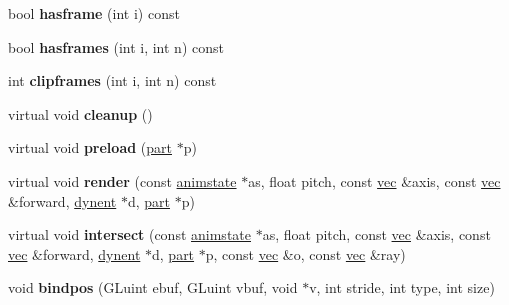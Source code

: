 \begin{DoxyCompactItemize}
\item 
\mbox{\label{structanimmodel_1_1meshgroup_a15dbdfc1083a258110a8d656152b5e35}} 
bool {\bfseries hasframe} (int i) const
\item 
\mbox{\label{structanimmodel_1_1meshgroup_ad8e26304cb9c795c7c1d62858d99ac69}} 
bool {\bfseries hasframes} (int i, int n) const
\item 
\mbox{\label{structanimmodel_1_1meshgroup_a045d04608f8a49435b9ba54459d32fde}} 
int {\bfseries clipframes} (int i, int n) const
\item 
\mbox{\label{structanimmodel_1_1meshgroup_a2a46d8085d77c9ea70110461ca65cec6}} 
virtual void {\bfseries cleanup} ()
\item 
\mbox{\label{structanimmodel_1_1meshgroup_a6978ac7e5db2bf75693b278508ebbd3e}} 
virtual void {\bfseries preload} (\hyperlink{structanimmodel_1_1part}{part} $\ast$p)
\item 
\mbox{\label{structanimmodel_1_1meshgroup_ac01a9b8c3bc84f5125616c97a619b396}} 
virtual void {\bfseries render} (const \hyperlink{structanimmodel_1_1animstate}{animstate} $\ast$as, float pitch, const \hyperlink{structvec}{vec} \&axis, const \hyperlink{structvec}{vec} \&forward, \hyperlink{structdynent}{dynent} $\ast$d, \hyperlink{structanimmodel_1_1part}{part} $\ast$p)
\item 
\mbox{\label{structanimmodel_1_1meshgroup_a046f7840f0685f321082870a7f2919d6}} 
virtual void {\bfseries intersect} (const \hyperlink{structanimmodel_1_1animstate}{animstate} $\ast$as, float pitch, const \hyperlink{structvec}{vec} \&axis, const \hyperlink{structvec}{vec} \&forward, \hyperlink{structdynent}{dynent} $\ast$d, \hyperlink{structanimmodel_1_1part}{part} $\ast$p, const \hyperlink{structvec}{vec} \&o, const \hyperlink{structvec}{vec} \&ray)
\item 
\mbox{\label{structanimmodel_1_1meshgroup_ac6e45d64b0765c14aa9dab72ef320a1b}} 
void {\bfseries bindpos} (G\+Luint ebuf, G\+Luint vbuf, void $\ast$v, int stride, int type, int size)

\end{DoxyCompactItemize}
